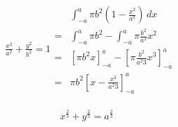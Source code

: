 \documentclass{article}
\begin{document}
\begin{gather*}
  \frac{x^{2}}{a^{2}} + \frac{y^{2}}{b^{2}} = 1
  \begin{align*}
  &\int_{-a}^{a} \pi b^{2}\left(1 - \frac{x^{2}}{a^{2}} \right) \,dx \\
  =&\int_{-a}^{a}\pi b^{2} -  \int_{-a}^{a}\pi \frac{b^{2}}{a^{2}}x^{2} \\
  =&\left[\pi b^{2} x\right]_{-a}^{a} -  \left[\pi \frac{b^{2}}{a^{2}3} x^{3} \right]_{-a}^{a} \\
  =&\pi b^{2} \left[ x - \frac{x^{3}}{a^{2}3} \right]_{-a}^{a}
  \end{align*}
\end{gather*}

\begin{gather*}
  x^{\frac{2}{3}} + y^{\frac{2}{3}} = a^{\frac{2}{3}}
  \begin{align*}
    
  \end{align*}
\end{gather*}
\end{document}
